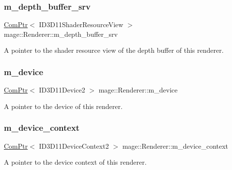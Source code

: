 \subsubsection{\texorpdfstring{m\+\_\+depth\+\_\+buffer\+\_\+srv}{m\_depth\_buffer\_srv}}
{\footnotesize\ttfamily \hyperlink{namespacemage_ae74f374780900893caa5555d1031fd79}{Com\+Ptr}$<$ I\+D3\+D11\+Shader\+Resource\+View $>$ mage\+::\+Renderer\+::m\+\_\+depth\+\_\+buffer\+\_\+srv\hspace{0.3cm}{\ttfamily [private]}}

A pointer to the shader resource view of the depth buffer of this renderer. \hypertarget{classmage_1_1_renderer_aecf4bcb70dc186b4f2083df38d1e4bc3}{}\label{classmage_1_1_renderer_aecf4bcb70dc186b4f2083df38d1e4bc3} 
\subsubsection{\texorpdfstring{m\+\_\+device}{m\_device}}
{\footnotesize\ttfamily \hyperlink{namespacemage_ae74f374780900893caa5555d1031fd79}{Com\+Ptr}$<$ I\+D3\+D11\+Device2 $>$ mage\+::\+Renderer\+::m\+\_\+device\hspace{0.3cm}{\ttfamily [private]}}

A pointer to the device of this renderer. \hypertarget{classmage_1_1_renderer_a47c4a1d46e84bbdc3ec876809633877e}{}\label{classmage_1_1_renderer_a47c4a1d46e84bbdc3ec876809633877e} 
\subsubsection{\texorpdfstring{m\+\_\+device\+\_\+context}{m\_device\_context}}
{\footnotesize\ttfamily \hyperlink{namespacemage_ae74f374780900893caa5555d1031fd79}{Com\+Ptr}$<$ I\+D3\+D11\+Device\+Context2 $>$ mage\+::\+Renderer\+::m\+\_\+device\+\_\+context\hspace{0.3cm}{\ttfamily [private]}}

A pointer to the device context of this renderer. \hypertarget{classmage_1_1_renderer_ab5638066fba5a0b9ce307f7db3ba5433}{}\label{classmage_1_1_renderer_ab5638066fba5a0b9ce307f7db3ba5433} 

